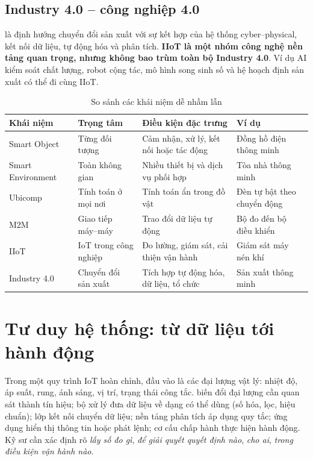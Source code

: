 \subsection{Industry 4.0 -- công nghiệp 4.0}
 là định hướng chuyển đổi sản xuất với sự kết hợp của hệ thống cyber--physical, kết nối dữ liệu, tự động hóa và phân tích. \textbf{IIoT là một nhóm công nghệ nền tảng quan trọng, nhưng không bao trùm toàn bộ Industry 4.0}. Ví dụ AI kiểm soát chất lượng, robot cộng tác, mô hình song sinh số và hệ hoạch định sản xuất có thể đi cùng IIoT.

\begin{table}[H]\centering\small
\caption{So sánh các khái niệm dễ nhầm lẫn}
\begin{tabularx}{\textwidth}{p{2.45cm}XXX}\toprule
Khái niệm&Trọng tâm&Điều kiện đặc trưng&Ví dụ\\\midrule
Smart Object&Từng đối tượng&Cảm nhận, xử lý, kết nối hoặc tác động&Đồng hồ điện thông minh\\
Smart Environment&Toàn không gian&Nhiều thiết bị và dịch vụ phối hợp&Tòa nhà thông minh\\
Ubicomp&Tính toán ở mọi nơi&Tính toán ẩn trong đồ vật&Đèn tự bật theo chuyển động\\
M2M&Giao tiếp máy--máy&Trao đổi dữ liệu tự động&Bộ đo đến bộ điều khiển\\
IIoT&IoT trong công nghiệp&Đo lường, giám sát, cải thiện vận hành&Giám sát máy nén khí\\
Industry 4.0&Chuyển đổi sản xuất&Tích hợp tự động hóa, dữ liệu, tổ chức&Sản xuất thông minh\\\bottomrule
\end{tabularx}
\end{table}

\section{Tư duy hệ thống: từ dữ liệu tới hành động}
Trong một quy trình IoT hoàn chỉnh, đầu vào là các đại lượng vật lý: nhiệt độ, áp suất, rung, ánh sáng, vị trí, trạng thái công tắc.  biến đổi đại lượng cần quan sát thành tín hiệu; bộ xử lý đưa dữ liệu về dạng có thể dùng (số hóa, lọc, hiệu chuẩn); lớp kết nối chuyển dữ liệu; nền tảng phân tích áp dụng quy tắc; ứng dụng hiển thị thông tin hoặc phát lệnh; cơ cấu chấp hành thực hiện hành động. Kỹ sư cần xác định rõ \emph{lấy số đo gì}, \emph{để giải quyết quyết định nào}, \emph{cho ai}, \emph{trong điều kiện vận hành nào}.

